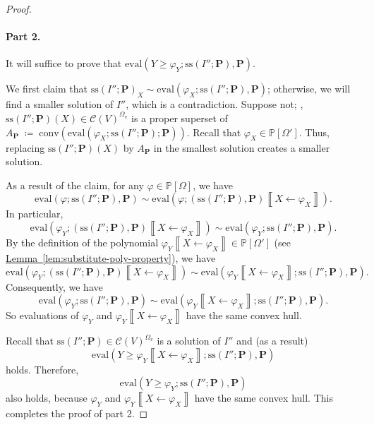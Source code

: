 \documentclass[10pt]{amsart}
\theoremstyle{plain}
\theoremstyle{definition}
\providecommand{\namedref}[2]{\hyperref[#2]{#1~\ref*{#2}}\xspace}
\providecommand{\lemmaref}[1]{\namedref{Lemma}{lem:#1}}
\providecommand{\cC}[0]{\ensuremath{\mathcal C}\xspace}
\providecommand{\bP}[0]{\ensuremath{\mathbf P}\xspace}
\providecommand{\ie}[0]{\text{i.e.}\xspace}
\let\geq\geqslant
\providecommand{\defeq}[0]{\ensuremath{\;\coloneqq\;}\xspace}
\providecommand{\conv}[1]{\ensuremath{\mathrm{conv}{\left({#1}\right)}\xspace}}
\providecommand{\convset}[0]{\ensuremath{\cC}\xspace}
\providecommand{\ssol}{\ensuremath{\mathrm{ss}}\xspace}
\providecommand{\evalmap}[0]{\ensuremath{\mathrm{eval}}\xspace}
\begin{document}
\begin{proof}
    \paragraph{Part 2.}
    It will suffice to prove that 
        $\evalmap\left( Y\geq \varphi_Y ; \ssol(I'';\bP), \bP \right)$. 

    We first claim that $\ssol(I'';\bP)_X \sim \evalmap\left( \varphi_X ; \ssol(I'';\bP), \bP \right)$; otherwise, we will find a smaller solution of $I''$, which is a contradiction. 
    Suppose not; \ie, $\ssol(I'';\bP)(X) \in\convset(V)^{\Omega_v}$ is a proper superset of $A_\bP\defeq \conv{\evalmap(\varphi_X;\ssol(I'';\bP);\bP)}$. 
    Recall that $\varphi_X \in\mathbb{P}[\Omega']$. 
    Thus, replacing $\ssol(I'';\bP)(X)$ by $A_\bP$ in the smallest solution creates a smaller solution. 

    As a result of the claim, for any $\varphi \in \mathbb{P}[\Omega]$, we have
    \[\evalmap\left(\varphi ; \ssol(I'';\bP),\bP\right) \sim \evalmap\left(\varphi ; (\ssol(I'';\bP),\bP)\left\llbracket X\gets\varphi_X\right\rrbracket\right).
    \]
    In particular, 
        $$\evalmap\left(\varphi_Y ; (\ssol(I'';\bP),\bP)\left\llbracket X\gets\varphi_X\right\rrbracket \right) \sim \evalmap\left(\varphi_Y ; \ssol(I'';\bP),\bP\right).$$
    By the definition of the polynomial $\varphi_Y\left\llbracket X\gets\varphi_X \right\rrbracket \in \mathbb{P}[\Omega']$ (see \lemmaref{substitute-poly-property}), we have 
        $$\evalmap\left(\varphi_Y ; (\ssol(I'';\bP),\bP)\left\llbracket X\gets\varphi_X\right\rrbracket \right) 
            \sim \evalmap\left(\varphi_Y\left\llbracket X\gets\varphi_X \right\rrbracket ; \ssol(I'';\bP),\bP\right).$$
    Consequently, we have 
        $$ \evalmap\left(\varphi_Y ; \ssol(I'';\bP),\bP\right) \sim \evalmap\left(\varphi_Y\left\llbracket X\gets\varphi_X \right\rrbracket ; \ssol(I'';\bP),\bP\right).$$
    So evaluations of $\varphi_Y$ and $\varphi_Y\left\llbracket X\gets\varphi_X \right\rrbracket $ have the same convex hull. 

    Recall that $\ssol(I'';\bP)\in\convset(V)^{\Omega_v}$ is a solution of $I''$ and (as a result)  
    \[
    \evalmap\left(Y\geq \varphi_Y\left\llbracket X\gets\varphi_X \right\rrbracket ; \ssol(I'';\bP),\bP\right)
    \]
    holds. 
    Therefore, 
    \[
    \evalmap\left(Y\geq \varphi_Y ; \ssol(I'';\bP),\bP\right)
    \]
    also holds, because $\varphi_Y$ and $\varphi_Y\left\llbracket X\gets\varphi_X \right\rrbracket $ have the same convex hull. 
    This completes the proof of part 2. 
\end{proof}
\end{document}
